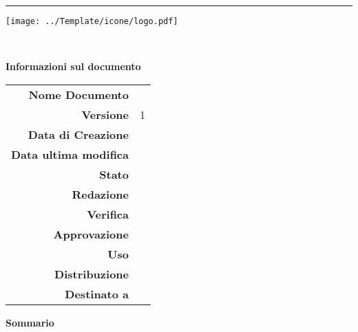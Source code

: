 \begin{center}


\begin{Huge} \textbf{\progetto} \end{Huge}
  \vspace{0.2em}

\hrule
\vspace{-7em}

\texttt{[image: ../Template/icone/logo.pdf]}
\vspace{-10em}

\begin{center} 
  \begin{Huge}
  \textbf{\\ \gruppo} 
  \end{Huge}
\end{center}

\begin{Huge} \documento \end{Huge}

\begin{center}
\textbf{Informazioni sul documento} \\ \vspace{2em}
\small
\begin{tabular}{r|l}
	\textbf{Nome Documento} & \nomedocumentofisico \\
	\textbf{Versione}	& 1\\
	\textbf{Data di Creazione} & \datacreazione\\
	\textbf{Data ultima modifica} & \datamodifica\\
	\textbf{Stato} & \stato \\
	\textbf{Redazione}	& \redazione\\
	\textbf{Verifica}	& \verifica\\
	\textbf{Approvazione}	& \approvazione\\
	\textbf{Uso}  & \uso\\
	\textbf{Distribuzione} & \gruppo \\
	\textbf{Destinato a}  &  \destinateTo
\end{tabular}
\end{center}
\normalsize

\vspace{4em}

\textbf{Sommario\\} 


\vfill

\end{center}

